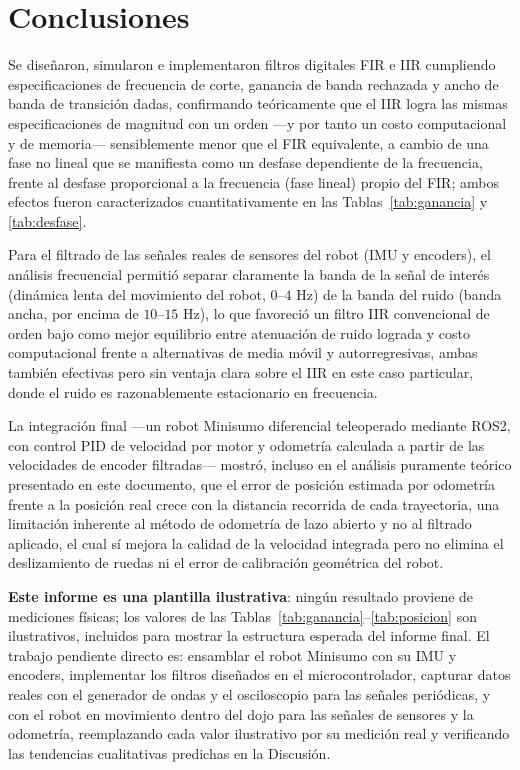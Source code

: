 
\section{Conclusiones}

Se diseñaron, simularon e implementaron filtros digitales FIR e IIR cumpliendo especificaciones de frecuencia de corte, ganancia de banda rechazada y ancho de banda de transición dadas, confirmando teóricamente que el IIR logra las mismas especificaciones de magnitud con un orden —y por tanto un costo computacional y de memoria— sensiblemente menor que el FIR equivalente, a cambio de una fase no lineal que se manifiesta como un desfase dependiente de la frecuencia, frente al desfase proporcional a la frecuencia (fase lineal) propio del FIR; ambos efectos fueron caracterizados cuantitativamente en las Tablas~\ref{tab:ganancia} y \ref{tab:desfase}.

Para el filtrado de las señales reales de sensores del robot (IMU y encoders), el análisis frecuencial permitió separar claramente la banda de la señal de interés (dinámica lenta del movimiento del robot, $0$--$4$ Hz) de la banda del ruido (banda ancha, por encima de $10$--$15$ Hz), lo que favoreció un filtro IIR convencional de orden bajo como mejor equilibrio entre atenuación de ruido lograda y costo computacional frente a alternativas de media móvil y autorregresivas, ambas también efectivas pero sin ventaja clara sobre el IIR en este caso particular, donde el ruido es razonablemente estacionario en frecuencia.

La integración final —un robot Minisumo diferencial teleoperado mediante ROS2, con control PID de velocidad por motor y odometría calculada a partir de las velocidades de encoder filtradas— mostró, incluso en el análisis puramente teórico presentado en este documento, que el error de posición estimada por odometría frente a la posición real crece con la distancia recorrida de cada trayectoria, una limitación inherente al método de odometría de lazo abierto y no al filtrado aplicado, el cual sí mejora la calidad de la velocidad integrada pero no elimina el deslizamiento de ruedas ni el error de calibración geométrica del robot.

\textbf{Este informe es una plantilla ilustrativa}: ningún resultado proviene de mediciones físicas; los valores de las Tablas~\ref{tab:ganancia}--\ref{tab:posicion} son ilustrativos, incluidos para mostrar la estructura esperada del informe final. El trabajo pendiente directo es: ensamblar el robot Minisumo con su IMU y encoders, implementar los filtros diseñados en el microcontrolador, capturar datos reales con el generador de ondas y el osciloscopio para las señales periódicas, y con el robot en movimiento dentro del dojo para las señales de sensores y la odometría, reemplazando cada valor ilustrativo por su medición real y verificando las tendencias cualitativas predichas en la Discusión.

